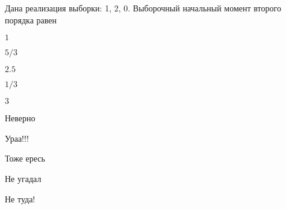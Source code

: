 
\begin{question}
Дана реализация выборки: 1, 2, 0. Выборочный начальный момент второго
порядка равен
\begin{answerlist}
  \item \(1\)
  \item \(5/3\)
  \item \(2.5\)
  \item \(1/3\)
  \item \(3\)
\end{answerlist}
\end{question}

\begin{solution}
\begin{answerlist}
  \item Неверно
  \item Ураа!!!
  \item Тоже ересь
  \item Не угадал
  \item Не туда!
\end{answerlist}
\end{solution}

